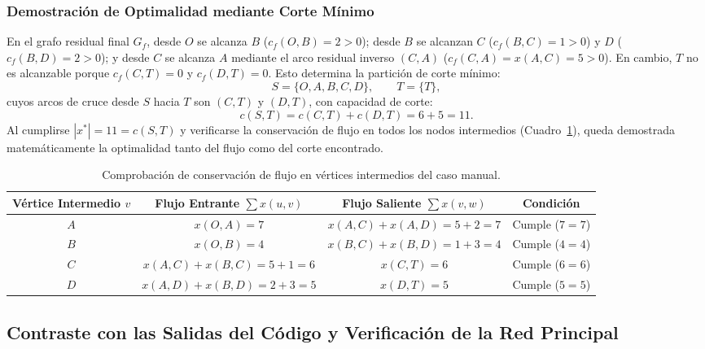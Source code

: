\documentclass[11pt,a4paper]{article}
\begin{document}
\subsubsection{Demostración de Optimalidad mediante Corte Mínimo}
En el grafo residual final $G_f$, desde $O$ se alcanza $B$ ($c_f(O,B) = 2 > 0$); desde $B$ se alcanzan $C$ ($c_f(B,C) = 1 > 0$) y $D$ ($c_f(B,D) = 2 > 0$); y desde $C$ se alcanza $A$ mediante el arco residual inverso $(C, A)$ ($c_f(C,A) = x(A,C) = 5 > 0$). En cambio, $T$ no es alcanzable porque $c_f(C,T) = 0$ y $c_f(D,T) = 0$. Esto determina la partición de corte mínimo:
\[
    S = \{O, A, B, C, D\}, \qquad T = \{T\},
\]
cuyos arcos de cruce desde $S$ hacia $T$ son $(C, T)$ y $(D, T)$, con capacidad de corte:
\[
    c(S, T) = c(C, T) + c(D, T) = 6 + 5 = 11.
\]
Al cumplirse $|x^*| = 11 = c(S, T)$ y verificarse la conservación de flujo en todos los nodos intermedios (Cuadro~\ref{tab:verificacion_manual}), queda demostrada matemáticamente la optimalidad tanto del flujo como del corte encontrado.

\begin{table}[H]
\centering
\caption{Comprobación de conservación de flujo en vértices intermedios del caso manual.}
\label{tab:verificacion_manual}
\begin{tabular}{cccc}
\toprule
\textbf{Vértice Intermedio $v$} & \textbf{Flujo Entrante $\sum x(u,v)$} & \textbf{Flujo Saliente $\sum x(v,w)$} & \textbf{Condición} \\
\midrule
$A$ & $x(O,A) = 7$ & $x(A,C) + x(A,D) = 5 + 2 = 7$ & Cumple ($7 = 7$) \\
$B$ & $x(O,B) = 4$ & $x(B,C) + x(B,D) = 1 + 3 = 4$ & Cumple ($4 = 4$) \\
$C$ & $x(A,C) + x(B,C) = 5 + 1 = 6$ & $x(C,T) = 6$ & Cumple ($6 = 6$) \\
$D$ & $x(A,D) + x(B,D) = 2 + 3 = 5$ & $x(D,T) = 5$ & Cumple ($5 = 5$) \\
\bottomrule
\end{tabular}
\end{table}

\subsection{Contraste con las Salidas del Código y Verificación de la Red Principal}
\end{document}
